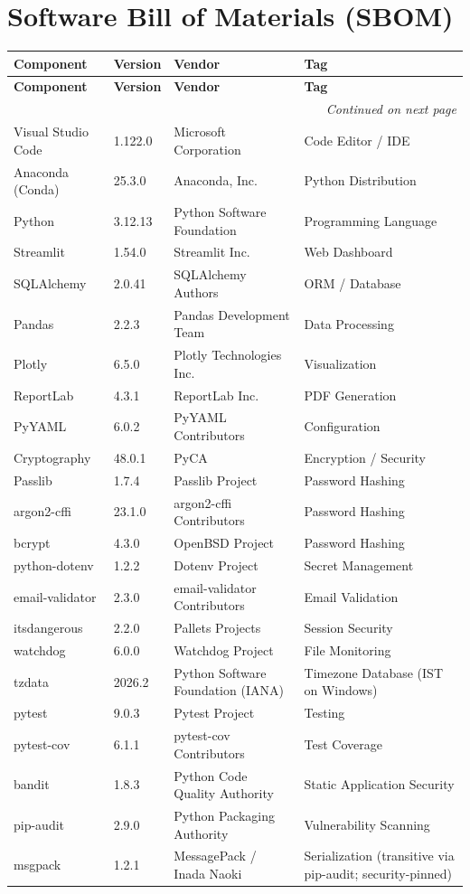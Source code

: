\documentclass[12pt,a4paper]{article}
\begin{document}
\section{Software Bill of Materials (SBOM)}

\begin{longtable}{|p{3.5cm}|p{1.5cm}|p{6cm}|p{5cm}|}
\hline
\textbf{Component} & \textbf{Version} & \textbf{Vendor} & \textbf{Tag} \\
\hline
\endfirsthead
\hline
\textbf{Component} & \textbf{Version} & \textbf{Vendor} & \textbf{Tag} \\
\hline
\endhead
\hline
\multicolumn{4}{|r|}{\textit{Continued on next page}} \\
\hline
\endfoot
\hline
\endlastfoot

Visual Studio Code & 1.122.0 & Microsoft Corporation & Code Editor / IDE \\
Anaconda (Conda) & 25.3.0 & Anaconda, Inc. & Python Distribution \\
Python & 3.12.13 & Python Software Foundation & Programming Language \\
Streamlit & 1.54.0 & Streamlit Inc. & Web Dashboard \\
SQLAlchemy & 2.0.41 & SQLAlchemy Authors & ORM / Database \\
Pandas & 2.2.3 & Pandas Development Team & Data Processing \\
Plotly & 6.5.0 & Plotly Technologies Inc. & Visualization \\
ReportLab & 4.3.1 & ReportLab Inc. & PDF Generation \\
PyYAML & 6.0.2 & PyYAML Contributors & Configuration \\
Cryptography & 48.0.1 & PyCA & Encryption / Security \\
Passlib & 1.7.4 & Passlib Project & Password Hashing \\
argon2-cffi & 23.1.0 & argon2-cffi Contributors & Password Hashing \\
bcrypt & 4.3.0 & OpenBSD Project & Password Hashing \\
python-dotenv & 1.2.2 & Dotenv Project & Secret Management \\
email-validator & 2.3.0 & email-validator Contributors & Email Validation \\
itsdangerous & 2.2.0 & Pallets Projects & Session Security \\
watchdog & 6.0.0 & Watchdog Project & File Monitoring \\
tzdata & 2026.2 & Python Software Foundation (IANA) & Timezone Database (IST on Windows) \\
pytest & 9.0.3 & Pytest Project & Testing \\
pytest-cov & 6.1.1 & pytest-cov Contributors & Test Coverage \\
bandit & 1.8.3 & Python Code Quality Authority & Static Application Security \\
pip-audit & 2.9.0 & Python Packaging Authority & Vulnerability Scanning \\
msgpack & 1.2.1 & MessagePack / Inada Naoki & Serialization (transitive via pip-audit; security-pinned) \\

\end{longtable}
\label{tab:sbom}
\end{document}
